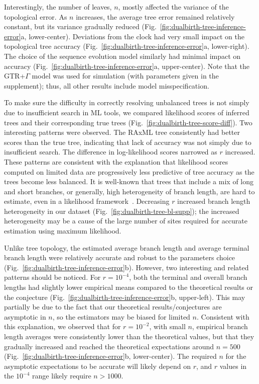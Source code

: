 Interestingly, the number of leaves, $n$, mostly affected the variance of the topological error. As $n$ increases, the average tree error remained relatively constant, but its variance gradually reduced (Fig.~\ref{fig:dualbirth-tree-inference-error}a, lower-center). Deviations from the clock had very small impact on the topological tree accuracy (Fig.~\ref{fig:dualbirth-tree-inference-error}a, lower-right). The choice of the sequence evolution model similarly had minimal impact on accuracy (Fig.~\ref{fig:dualbirth-tree-inference-error}a, upper-center). Note that the \gls{GTR}+$\Gamma$ model was used for simulation (with parameters given in the supplement); thus, all other results include model misspecification.

To make sure the difficulty in correctly resolving unbalanced trees is not simply due to insufficient search in ML tools, we compared likelihood scores of inferred trees and their corresponding true trees (Fig.~\ref{fig:dualbirth-tree-score-diff}). Two interesting patterns were observed. The RAxML tree consistently had better scores than the true tree, indicating that lack of accuracy was not simply due to insufficient search. The difference in log-likelihood scores narrowed as $r$ increased. These patterns are consistent with the explanation that likelihood scores computed on limited data are progressively less predictive of tree accuracy as the trees become less balanced. It is well-known that trees that include a mix of long and short branches, or generally, high heterogeneity of branch length, are hard to estimate, even in a likelihood framework~\cite{Kuhner1994,Kolaczkowski2004}. Decreasing $r$ increased branch length heterogeneity in our dataset (Fig.~\ref{fig:dualbirth-tree-bl-supp}); the increased heterogeneity may be a cause of the large number of sites required for accurate estimation using maximum likelihood. 

Unlike tree topology, the estimated average branch length and average terminal branch length were relatively accurate and robust to the parameters choice (Fig.~\ref{fig:dualbirth-tree-inference-error}b). However, two interesting and related patterns should be noticed. For $r=10^{-4}$, both the terminal and overall branch lengths had slightly lower empirical means compared to the theoretical results or the conjecture (Fig.~\ref{fig:dualbirth-tree-inference-error}b, upper-left). This may partially be due to the fact that our theoretical results/conjectures are asymptotic in $n$, so the estimators may be biased for limited $n$. Consistent with this explanation, we observed that for $r=10^{-2}$, with small $n$, empirical branch length averages were consistently lower than the theoretical values, but that they gradually increased and reached the theoretical expectations around $n=500$ (Fig.~\ref{fig:dualbirth-tree-inference-error}b, lower-center). The required $n$ for the asymptotic expectations to be accurate will likely depend on $r$, and $r$ values in the $10^{-4}$ range likely require $n>1000$.

